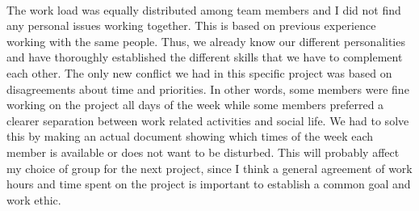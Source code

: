 \\
The work load was equally distributed among team members and I did not find any personal issues working together. This is based on previous experience working with the same people. Thus, we already know our different personalities and have thoroughly established the different skills that we have to complement each other. The only new conflict we had in this specific project was based on disagreements about time and priorities. In other words, some members were fine working on the project all days of the week while some members preferred a clearer separation between work related activities and social life. We had to solve this by making an actual document showing which times of the week each member is available or does not want to be disturbed. This will probably affect my choice of group for the next project, since I think a general agreement of work hours and time spent on the project is important to establish a common goal and work ethic. 

